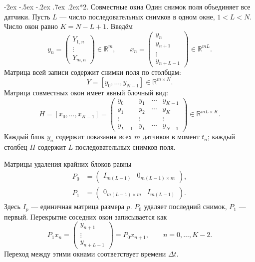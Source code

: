 \documentclass[11pt,a4paper]{article}
\makeatletter
\renewcommand\section{\@startsection{section}{1}{\z@}%
  {-2ex \@plus -.5ex \@minus -.2ex}%
  {.7ex \@plus .2ex}{\normalfont\Large\bfseries}}
\makeatother
\begin{document}
\section*{2. Совместные окна}
Один снимок поля объединяет все датчики.
Пусть $L$ --- число последовательных снимков в одном окне, $1<L<N$.
Число окон равно $K=N-L+1$. Введём
\begin{equation}
y_n=\begin{pmatrix}Y_{1,n}\\ \vdots\\ Y_{m,n}\end{pmatrix}\in\mathbb R^m,
\qquad
x_n=\begin{pmatrix}y_n\\ y_{n+1}\\ \vdots\\ y_{n+L-1}\end{pmatrix}
\in\mathbb R^{mL}.
\label{eq:joint-windows}
\end{equation}
Матрица всей записи содержит снимки поля по столбцам:
$$
Y=[y_0,\ldots,y_{N-1}]\in\mathbb R^{m\times N}.
$$
Матрица совместных окон имеет явный блочный вид:
\begin{equation}
H=[x_0,\ldots,x_{K-1}]=
\begin{pmatrix}
y_0&y_1&\cdots&y_{K-1}\\
y_1&y_2&\cdots&y_K\\
\vdots&\vdots&&\vdots\\
y_{L-1}&y_L&\cdots&y_{N-1}
\end{pmatrix}\in\mathbb R^{mL\times K}.
\label{eq:joint-H}
\end{equation}
Каждый блок $y_n$ содержит показания всех $m$ датчиков в момент $t_n$;
каждый столбец $H$ содержит $L$ последовательных снимков поля.

Матрицы удаления крайних блоков равны
$$
\begin{aligned}
P_0&=\begin{pmatrix}I_{m(L-1)}&0_{m(L-1)\times m}\end{pmatrix},\\
P_1&=\begin{pmatrix}0_{m(L-1)\times m}&I_{m(L-1)}\end{pmatrix}.
\end{aligned}
$$
Здесь $I_p$ --- единичная матрица размера $p$.
$P_0$ удаляет последний снимок, $P_1$ --- первый.
Перекрытие соседних окон записывается как
\begin{equation}
P_1x_n=
\begin{pmatrix}y_{n+1}\\ \vdots\\ y_{n+L-1}\end{pmatrix}
=P_0x_{n+1},\qquad n=0,\ldots,K-2.
\label{eq:window-overlap}
\end{equation}
Переход между этими окнами соответствует времени $\Delta t$.
\end{document}
